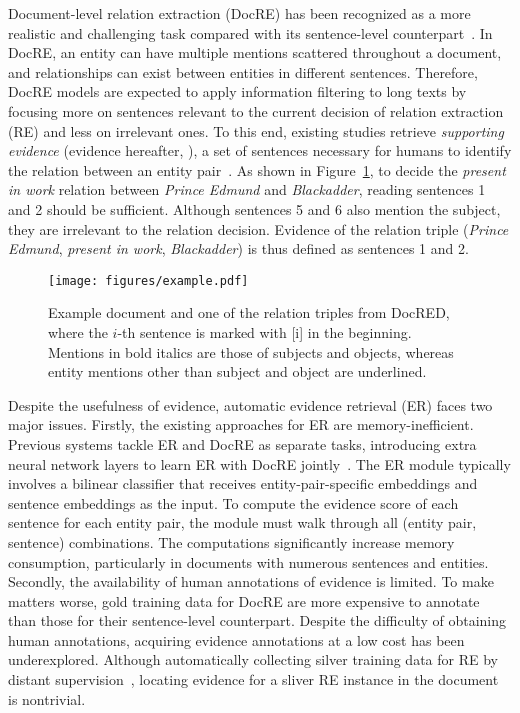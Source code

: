 \documentclass[11pt]{article}
\begin{document}
Document-level relation extraction (DocRE) has been recognized as a more realistic and challenging task compared with its sentence-level counterpart~\cite{peng-etal-2017-cross,verga-etal-2018-simultaneously,yao-etal-2019-docred}.
In DocRE, an entity can have multiple mentions scattered throughout a document, and relationships can exist between entities in different sentences.
Therefore, DocRE models are expected to apply information filtering to long texts by focusing more on sentences relevant to the current decision of relation extraction (RE) and less on irrelevant ones.
To this end, existing studies retrieve \textit{supporting evidence} (evidence hereafter, \citealp{yao-etal-2019-docred}), a set of sentences necessary for humans to identify the relation between an entity pair~\cite{huang-etal-2021-entity,huang-etal-2021-three,xie-etal-2022-eider,xiao-etal-2022-sais,xu-etal-2022-document}.
As shown in Figure~\ref{fig:example}, to decide the \textit{present in work} relation between \textit{Prince Edmund} and \textit{Blackadder}, reading sentences 1 and 2 should be sufficient.
Although sentences 5 and 6 also mention the subject, they are irrelevant to the relation decision.
Evidence of the relation triple (\textit{Prince Edmund}, \textit{present in work}, \textit{Blackadder}) is thus defined as sentences 1 and 2.
\begin{figure}[t]
    \centering
    \texttt{[image: figures/example.pdf]}
    \caption{Example document and one of the relation triples from DocRED, where the $i$-th sentence is marked with [i] in the beginning. Mentions in bold italics are those of subjects and objects, whereas entity mentions other than subject and object are underlined.}
    \label{fig:example}
\end{figure}

Despite the usefulness of evidence, automatic evidence retrieval (ER) faces two major issues.
Firstly, the existing approaches for ER are memory-inefficient.
Previous systems tackle ER and DocRE as separate tasks, introducing extra neural network layers to learn ER with DocRE jointly~\cite{huang-etal-2021-entity,xie-etal-2022-eider,xiao-etal-2022-sais}.
The ER module typically involves a bilinear classifier that receives entity-pair-specific embeddings and sentence embeddings as the input.
To compute the evidence score of each sentence for each entity pair, the module must walk through all (entity pair, sentence) combinations.
The computations significantly increase memory consumption, particularly in documents with numerous sentences and entities.
Secondly, the availability of human annotations of evidence is limited.
To make matters worse, gold training data for DocRE are more expensive to annotate than those for their sentence-level counterpart.
Despite the difficulty of obtaining human annotations, acquiring evidence annotations at a low cost has been underexplored.
Although automatically collecting silver training data for RE by distant supervision~\cite{mintz-etal-2009-distant,yao-etal-2019-docred}, locating evidence for a sliver RE instance in the document is nontrivial.
\end{document}
